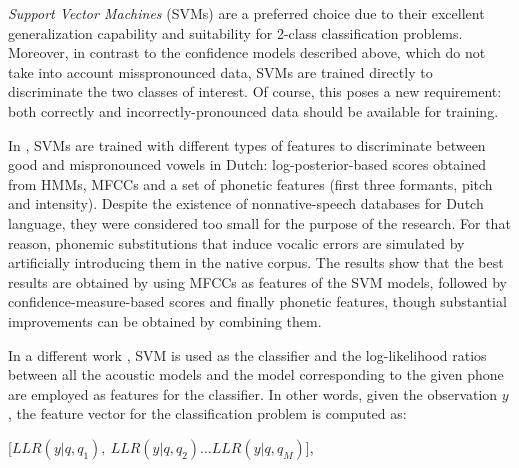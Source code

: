 \textit{Support Vector Machines} (SVMs) are a preferred choice 
due to their excellent generalization capability and suitability for 2-class classification
problems. Moreover, in contrast to the confidence models described above, which do not take into
account misspronounced data, SVMs are trained directly to discriminate the two classes of interest.
Of course, this poses a new requirement: both correctly and incorrectly-pronounced data should be
available for training.

In \cite{detection_mispronunciation_dutch_vowel}, SVMs are trained with different types of
features to discriminate between good and mispronounced vowels in Dutch: log-posterior-based 
scores obtained from HMMs, MFCCs and a set of 
phonetic features (first three formants, pitch and intensity). Despite the existence of nonnative-speech  
databases for Dutch language, they were considered too small for the purpose of the research. 
For that reason, phonemic 
substitutions that induce vocalic errors are simulated by artificially introducing them in the native corpus.
The results show that the best 
results are obtained by using MFCCs as features of the SVM models, followed by confidence-measure-based 
scores and finally phonetic
features, though substantial improvements can be obtained by combining them.

In a different work \cite{svm_space_models}, SVM is used as the classifier and the
log-likelihood ratios between all the acoustic models and the model corresponding to the given
phone are employed as features for the classifier. In other words, given the observation
$y$, the feature vector for the classification problem is computed as:

[$LLR(y|q,q_{1}), \ LLR(y|q,q_{2}) \dotsc LLR(y|q, q_{M})$],

